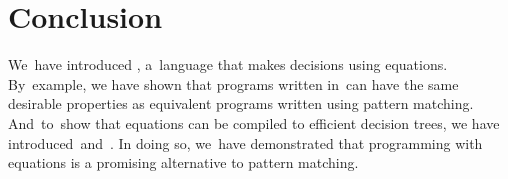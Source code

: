 \documentclass[article,screen,12pt, nonacm]{acmart}
\begin{document}
    
    
    

    
    
        







        

            
            
            





        
        
        

        

    \section{Conclusion}

    We~have introduced \VMinus, a~language that makes decisions using equations.
    By~example, we have shown that programs written in~\VMinus can have the same
    desirable properties as equivalent programs written using pattern matching.
    And~to~show that equations can be compiled to efficient decision trees, we
    have introduced~\D and~\DTran. In doing so, we~have demonstrated that
    programming with equations is a promising alternative to pattern matching.
    
    
\end{document}
